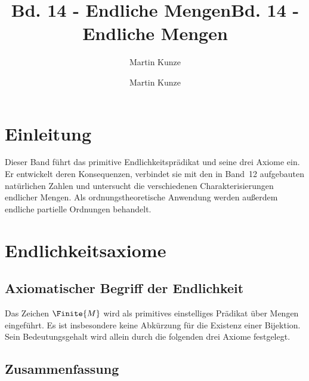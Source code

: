 \documentclass[main.tex]{subfiles}
\title{Bd. 14 - Endliche Mengen}
\author{Martin Kunze}
\date{}
\begin{document}
\title{Bd. 14 - Endliche Mengen}
\author{Martin Kunze}
\date{}
\hypersetup{pageanchor=false}
\maketitle
\hypersetup{pageanchor=true}
\setcounter{tocdepth}{3}
\tableofcontents
\setcounter{file}{14}
\renewcommand{\FormulaBandID}{14}

\chapter{Einleitung}

Dieser Band führt das primitive Endlichkeitsprädikat und seine drei Axiome
ein. Er entwickelt deren Konsequenzen, verbindet sie mit den in Band~12
aufgebauten natürlichen Zahlen und untersucht die verschiedenen
Charakterisierungen endlicher Mengen. Als ordnungstheoretische Anwendung
werden außerdem endliche partielle Ordnungen behandelt.

\chapter{Endlichkeitsaxiome}

\section{Axiomatischer Begriff der Endlichkeit}

Das Zeichen \(\Finite{M}\) wird als primitives einstelliges Prädikat über
Mengen eingeführt. Es ist insbesondere keine Abkürzung für die Existenz einer
Bijektion. Sein Bedeutungsgehalt wird allein durch die folgenden drei Axiome
festgelegt.




\section{Zusammenfassung}
\end{document}
